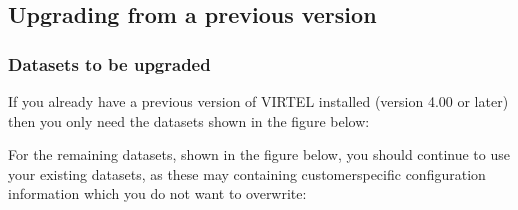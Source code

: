 \documentclass[letterpaper,10pt,english]{sphinxmanual}
\begin{document}
\subsection{Upgrading from a previous version}
\label{\detokenize{Installation_Guide:upgrading-from-a-previous-version}}

\subsubsection{Datasets to be upgraded}
\label{\detokenize{Installation_Guide:datasets-to-be-upgraded}}
\sphinxAtStartPar
If you already have a previous version of VIRTEL installed (version 4.00 or later) then you only need the datasets shown in the figure below:

\begin{sphinxVerbatim}[commandchars=\\\{\}]
\end{sphinxVerbatim}

\sphinxAtStartPar
{}

\sphinxAtStartPar
For the remaining datasets, shown in the figure below, you should continue to use your existing datasets, as these may containing customer\sphinxhyphen{}specific configuration information which you do not want to overwrite:

\begin{sphinxVerbatim}[commandchars=\\\{\}]
\end{sphinxVerbatim}
\end{document}
